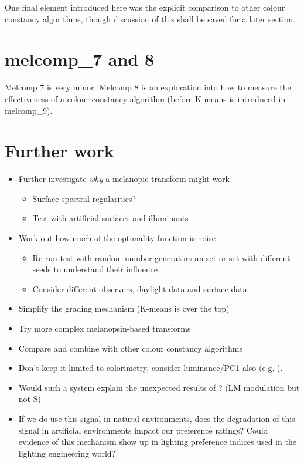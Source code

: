 One final element introduced here was the explicit comparison to other colour constancy algorithms, though discussion of this shall be saved for a later section.

\section{melcomp\_7 and 8}
Melcomp 7 is very minor.
Melcomp 8 is an exploration into how to measure the effectiveness of a colour constancy algorithm (before K-means is introduced in melcomp\_9).



\section{Further work}

\begin{itemize}
\item Further investigate \emph{why} a melanopic transform might work
\begin{itemize}
\item Surface spectral regularities?
\item Test with artificial surfaces and illuminants
\end{itemize}
\item Work out how much of the optimality function is noise
\begin{itemize}
\item Re-run test with random number generators un-set or set with different seeds to understand their influence
\item Consider different observers, daylight data and surface data
\end{itemize}
\item Simplify the grading mechanism (K-means is over the top)
\item Try more complex melanopsin-based transforms
\item Compare and combine with other colour constancy algorithms
\item Don't keep it limited to colorimetry, consider luminance/PC1 also (e.g. \citet{chakrabarti_color_2015}). 
\item Would such a system explain the unexpected results of \citet{cao_evidence_2018}? (LM modulation but not S)
\item If we do use this signal in natural environments, does the degradation of this signal in artificial environments impact our preference ratings? Could evidence of this mechanism show up in lighting preference indices used in the lighting engineering world?
\end{itemize}




